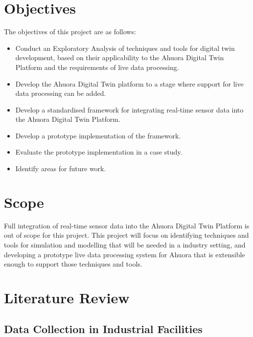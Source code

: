 
\section{Objectives}

The objectives of this project are as follows:
\begin{itemize}
    \item Conduct an Exploratory Analysis of techniques and tools for digital twin development, based on their applicability to the Ahuora Digital Twin Platform and the requirements of live data processing.
    \item Develop the Ahuora Digital Twin platform to a stage where support for live data processing can be added.
    \item Develop a standardised framework for integrating real-time sensor data into the Ahuora Digital Twin Platform.
    \item Develop a prototype implementation of the framework.
    \item Evaluate the prototype implementation in a case study.
    \item Identify areas for future work.
\end{itemize}
\section{Scope}

Full integration of real-time sensor data into the Ahuora Digital Twin Platform is out of scope for this project.
This project will focus on identifying techniques and tools for simulation and modelling that will be needed in a industry setting,
and developing a prototype live data processing system for Ahuora that is extensible enough to support those techniques and tools.


\section{Literature Review}


\subsection{Data Collection in Industrial Facilities}

